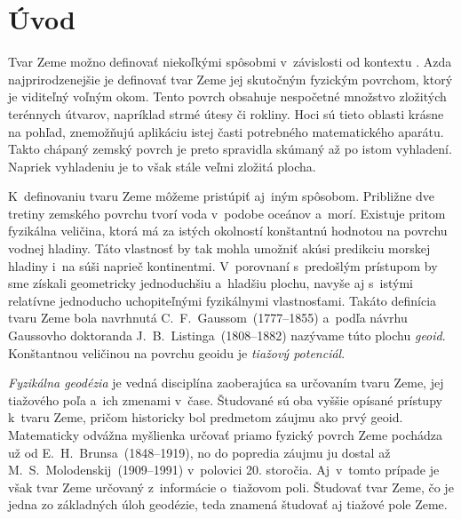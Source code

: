 \documentclass[a4paper, 12pt]{book}
\begin{document}
\tableofcontents
\newpage







\chapter*{Úvod}
\label{sec:introduction}

Tvar Zeme možno definovať niekoľkými spôsobmi v~závislosti od kontextu 
\parencite{MoritzTheFigureOfTheEarth}.  Azda najprirodzenejšie je definovať 
tvar Zeme jej skutočným fyzickým povrchom, ktorý je viditeľný voľným okom.  
Tento povrch obsahuje nespočetné množstvo zložitých terénnych útvarov, 
napríklad strmé útesy či rokliny.  Hoci sú tieto oblasti krásne na pohľad, 
znemožňujú aplikáciu istej časti potrebného matematického aparátu.  Takto 
chápaný zemský povrch je preto spravidla skúmaný až po istom vyhladení.  
Napriek vyhladeniu je to však stále veľmi zložitá plocha.

K~definovaniu tvaru Zeme môžeme pristúpiť aj~iným spôsobom.  Približne dve 
tretiny zemského povrchu tvorí voda v~podobe oceánov a~morí.  Existuje pritom 
fyzikálna veličina, ktorá má za istých okolností konštantnú hodnotou na povrchu 
vodnej hladiny.  Táto vlastnosť by tak mohla umožniť akúsi predikciu morskej 
hladiny i~na súši naprieč kontinentmi.  V~porovnaní s~predošlým prístupom by 
sme získali geometricky jednoduchšiu a~hladšiu plochu, navyše aj s~istými 
relatívne jednoducho uchopiteľnými fyzikálnymi vlastnosťami.  Takáto definícia 
tvaru Zeme bola navrhnutá C.~F.~Gaussom~(1777--1855) a~podľa návrhu Gaussovho 
doktoranda J.~B.~Listinga~(1808--1882) nazývame túto plochu \emph{geoid}.  
Konštantnou veličinou na povrchu geoidu je \emph{tiažový potenciál}.

\emph{Fyzikálna geodézia} je vedná disciplína zaoberajúca sa určovaním tvaru 
Zeme, jej tiažového poľa a~ich zmenami v~čase.  Študované sú oba vyššie opísané 
prístupy k~tvaru Zeme, pričom historicky bol predmetom záujmu ako prvý geoid.  
Matematicky odvážna myšlienka určovať priamo fyzický povrch Zeme pochádza už od 
E.~H.~Brunsa~(1848--1919), no do popredia záujmu ju dostal až 
M.~S.~Molodenskij~(1909--1991) v~polovici 20. storočia.  Aj~v~tomto prípade je 
však tvar Zeme určovaný z~informácie o~tiažovom poli.  Študovať tvar Zeme, čo 
je jedna zo základných úloh geodézie, teda znamená študovať aj tiažové pole 
Zeme.
\end{document}
